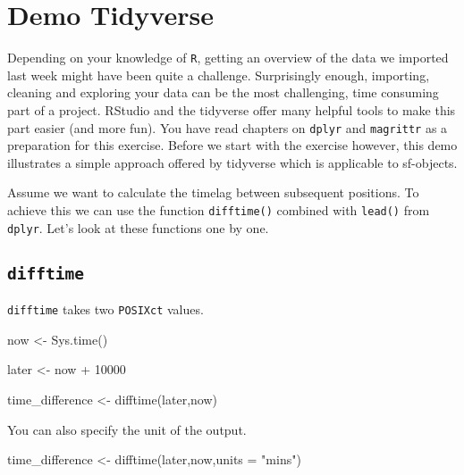 \documentclass[
]{book}
\newenvironment{Shaded}{\begin{snugshade}}{\end{snugshade}}
\newcommand{\AttributeTok}[1]{\textcolor[rgb]{0.77,0.63,0.00}{#1}}
\newcommand{\DecValTok}[1]{\textcolor[rgb]{0.00,0.00,0.81}{#1}}
\newcommand{\FunctionTok}[1]{\textcolor[rgb]{0.00,0.00,0.00}{#1}}
\newcommand{\NormalTok}[1]{#1}
\newcommand{\OtherTok}[1]{\textcolor[rgb]{0.56,0.35,0.01}{#1}}
\newcommand{\SpecialCharTok}[1]{\textcolor[rgb]{0.00,0.00,0.00}{#1}}
\newcommand{\StringTok}[1]{\textcolor[rgb]{0.31,0.60,0.02}{#1}}
\begin{document}
\hypertarget{demo-tidyverse}{%
\section{Demo Tidyverse}\label{demo-tidyverse}}

Depending on your knowledge of \texttt{R}, getting an overview of the data we imported last week might have been quite a challenge. Surprisingly enough, importing, cleaning and exploring your data can be the most challenging, time consuming part of a project. RStudio and the tidyverse offer many helpful tools to make this part easier (and more fun). You have read chapters on \texttt{dplyr} and \texttt{magrittr} as a preparation for this exercise. Before we start with the exercise however, this demo illustrates a simple approach offered by tidyverse which is applicable to sf-objects.

Assume we want to calculate the timelag between subsequent positions. To achieve this we can use the function \texttt{difftime()} combined with \texttt{lead()} from \texttt{dplyr}. Let's look at these functions one by one.

\hypertarget{difftime}{%
\subsection{\texorpdfstring{\texttt{difftime}}{difftime}}\label{difftime}}

\texttt{difftime} takes two \texttt{POSIXct} values.

\begin{Shaded}
\begin{Highlighting}[]
\NormalTok{now }\OtherTok{\textless{}{-}} \FunctionTok{Sys.time}\NormalTok{()}

\NormalTok{later }\OtherTok{\textless{}{-}}\NormalTok{ now }\SpecialCharTok{+} \DecValTok{10000}

\NormalTok{time\_difference }\OtherTok{\textless{}{-}} \FunctionTok{difftime}\NormalTok{(later,now)}
\end{Highlighting}
\end{Shaded}

You can also specify the unit of the output.

\begin{Shaded}
\begin{Highlighting}[]
\NormalTok{time\_difference }\OtherTok{\textless{}{-}} \FunctionTok{difftime}\NormalTok{(later,now,}\AttributeTok{units =} \StringTok{"mins"}\NormalTok{)}
\end{Highlighting}
\end{Shaded}
\end{document}
